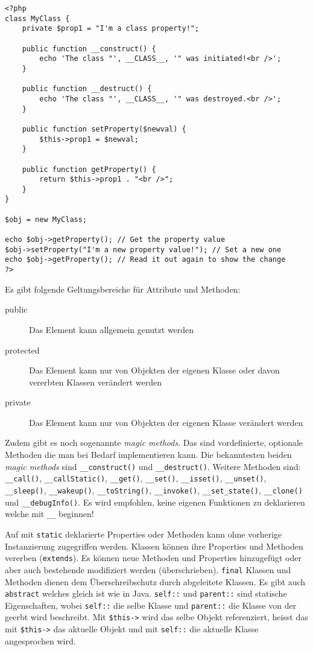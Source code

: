 \begin{lstlisting}[caption=Session, label=lst:klasse]
<?php
class MyClass {
	private $prop1 = "I'm a class property!";
	
	public function __construct() {
		echo 'The class "', __CLASS__, '" was initiated!<br />';
	}
	
	public function __destruct() {
		echo 'The class "', __CLASS__, '" was destroyed.<br />';
	}
	
	public function setProperty($newval) {
		$this->prop1 = $newval;
	}

	public function getProperty() {
		return $this->prop1 . "<br />";
	}
}

$obj = new MyClass;

echo $obj->getProperty(); // Get the property value
$obj->setProperty("I'm a new property value!"); // Set a new one
echo $obj->getProperty(); // Read it out again to show the change
?>
\end{lstlisting}
\noindent
Es gibt folgende Geltungsbereiche für Attribute und Methoden:
\begin{description}
	\item[public] Das Element kann allgemein genutzt werden
	\item[protected] Das Element kann nur von Objekten der eigenen Klasse oder davon vererbten Klassen verändert werden
	\item[private] Das Element kann nur von Objekten der eigenen Klasse verändert werden
\end{description}
Zudem gibt es noch sogenannte \textit{magic methods}. Das sind vordefinierte, optionale Methoden die man bei Bedarf implementieren kann. Die bekanntesten beiden \textit{magic methods} sind \verb|__construct()| und \verb|__destruct()|. Weitere Methoden sind: \verb|__call()|, \verb|__callStatic()|, \verb|__get()|, \verb|__set()|, \verb|__isset()|, \verb|__unset()|, \verb|__sleep()|, \verb|__wakeup()|, \verb|__toString()|, \verb|__invoke()|, \verb|__set_state()|, \verb|__clone()| und \verb|__debugInfo()|.
Es wird empfohlen, keine eigenen Funktionen zu
deklarieren welche mit \verb|__| beginnen!

Auf mit \verb|static| deklarierte Properties oder Methoden kann ohne vorherige Instanzierung zugegriffen werden. Klassen können ihre Properties und Methoden vererben (\verb|extends|). Es können neue Methoden und Properties hinzugefügt oder aber auch bestehende modifiziert werden (überschrieben). \verb|final| Klassen und Methoden dienen dem Überschreibschutz durch abgeleitete Klassen. Es gibt auch \verb|abstract| welches gleich ist wie in Java. \verb|self::| und \verb|parent::| sind statische Eigenschaften, wobei \verb|self::| die selbe Klasse und \verb|parent::| die Klasse von der geerbt wird beschreibt. Mit \verb|$this->| wird das selbe Objekt referenziert, heisst das mit \verb|$this->| das aktuelle Objekt und mit \verb|self::| die aktuelle Klasse angesprochen wird.

